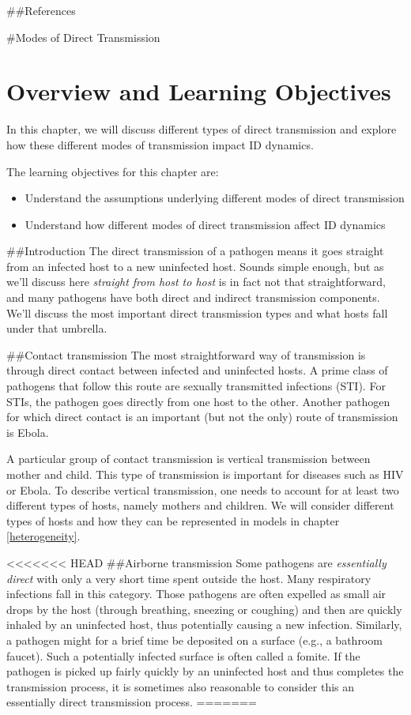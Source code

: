 \documentclass[]{book}
\providecommand{\tightlist}{%
  \setlength{\itemsep}{0pt}\setlength{\parskip}{0pt}}
\theoremstyle{definition}
\theoremstyle{definition}
\theoremstyle{definition}
\theoremstyle{remark}
\begin{document}
\#\#References

\#Modes of Direct Transmission

\hypertarget{overview-and-learning-objectives-5}{%
\section{Overview and Learning
Objectives}\label{overview-and-learning-objectives-5}}

In this chapter, we will discuss different types of direct transmission
and explore how these different modes of transmission impact ID
dynamics.

The learning objectives for this chapter are:

\begin{itemize}
\tightlist
\item
  Understand the assumptions underlying different modes of direct
  transmission
\item
  Understand how different modes of direct transmission affect ID
  dynamics
\end{itemize}

\#\#Introduction The direct transmission of a pathogen means it goes
straight from an infected host to a new uninfected host. Sounds simple
enough, but as we'll discuss here \emph{straight from host to host} is
in fact not that straightforward, and many pathogens have both direct
and indirect transmission components. We'll discuss the most important
direct transmission types and what hosts fall under that umbrella.

\#\#Contact transmission The most straightforward way of transmission is
through direct contact between infected and uninfected hosts. A prime
class of pathogens that follow this route are sexually transmitted
infections (STI). For STIs, the pathogen goes directly from one host to
the other. Another pathogen for which direct contact is an important
(but not the only) route of transmission is Ebola.

A particular group of contact transmission is vertical transmission
between mother and child. This type of transmission is important for
diseases such as HIV or Ebola. To describe vertical transmission, one
needs to account for at least two different types of hosts, namely
mothers and children. We will consider different types of hosts and how
they can be represented in models in chapter \ref{heterogeneity}.

<<<<<<< HEAD
\#\#Airborne transmission Some pathogens are \emph{essentially direct}
with only a very short time spent outside the host. Many respiratory
infections fall in this category. Those pathogens are often expelled as
small air drops by the host (through breathing, sneezing or coughing)
and then are quickly inhaled by an uninfected host, thus potentially
causing a new infection. Similarly, a pathogen might for a brief time be
deposited on a surface (e.g., a bathroom faucet). Such a potentially
infected surface is often called a fomite. If the pathogen is picked up
fairly quickly by an uninfected host and thus completes the transmission
process, it is sometimes also reasonable to consider this an essentially
direct transmission process.
=======
\end{document}
